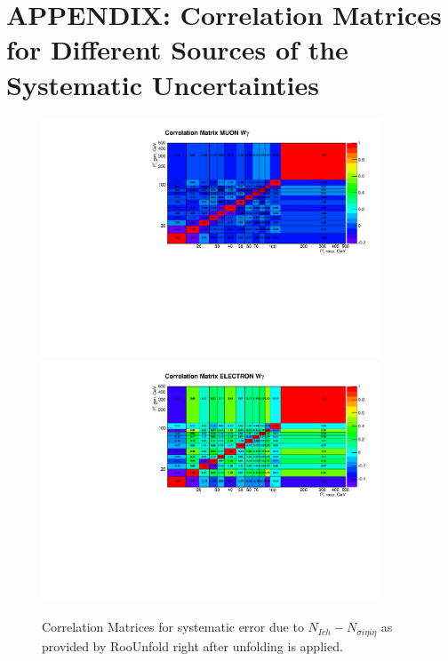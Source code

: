 \section{APPENDIX: Correlation Matrices for Different Sources of the Systematic Uncertainties}
\label{sec:corrMatrices}

\begin{figure}[htb]
  \begin{center}
   \includegraphics[width=0.90\textwidth]{../figs/figs_v11/MUON_WGamma/Constants/matrCorrelation_syst_CHISOvsSIHIH.pdf}\\
\includegraphics[width=0.90\textwidth]{../figs/figs_v11/ELECTRON_WGamma/Constants/matrCorrelation_syst_CHISOvsSIHIH.pdf}
  \caption{Correlation Matrices for systematic error due to $N_{Ich}-N_{\sigma i\eta i\eta}$ as provided by RooUnfold right after unfolding is applied.}
  \label{fig:corrMatrices_syst_CHISOvsSIHIH_Wg}
  \end{center}
\end{figure}

